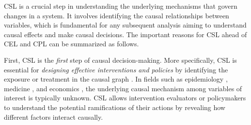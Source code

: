  

 
\acrshort{CSL} is a crucial step in understanding the underlying mechanisms that govern changes in a system. It involves identifying the causal relationships between variables, which is fundamental for any subsequent analysis aiming to understand causal effects and make causal decisions. The important reasons for \acrshort{CSL} ahead of \acrshort{CEL} and \acrshort{CPL} can be summarized as follows.




 

First, \acrshort{CSL} is the \textit{first} step of causal decision-making. More specifically, \acrshort{CSL} is essential for \textit{designing effective interventions and policies} by identifying the exposure or treatment in the causal graph \citep[see e.g.,][]{spirtes2000constructing,chickering2002optimal,shimizu2006linear,kalisch2007estimating,harris2013pc,buhlmann2014cam,ramsey2017million,zhang2018non}. In fields such as epidemiology \citep{hernan2004definition}, medicine \citep{hernan2000marginal},  and economics \citep{panizza2014public}, the underlying causal mechanism among variables of interest is typically unknown. \acrshort{CSL} allows intervention evaluators or policymakers to understand the potential ramifications of their actions by revealing how different factors interact causally.
 



